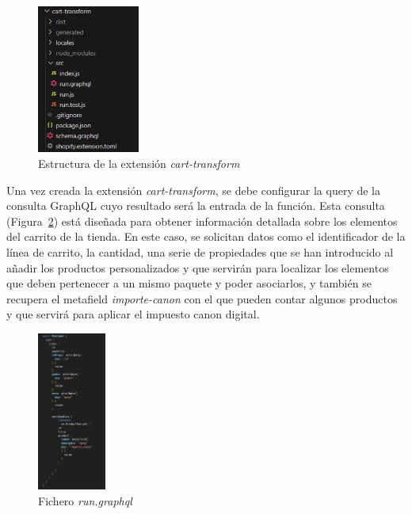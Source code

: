 \documentclass[12pt]{article}
\begin{document}
\begin{figure}[ht]
    \centering
    \includegraphics[width=0.3\textwidth]{imagenes-tema/estructuraCartTransform.png}
    \caption{\label{fig:estructuracarttrans} Estructura de la extensión \textit{cart-transform}}
    \vspace{\fill}
\end{figure}

Una vez creada la extensión \textit{cart-transform}, se debe configurar la query de la consulta GraphQL cuyo resultado será la entrada de la función. Esta consulta (Figura~\ref{fig:queryCart}) está diseñada para obtener
información detallada sobre los elementos del carrito de la tienda. En este caso, se solicitan datos como el identificador de la línea de carrito, la cantidad, una serie de propiedades que se han introducido al añadir los productos personalizados 
y que servirán para localizar los elementos que deben pertenecer a un mismo paquete y poder asociarlos, y también se recupera el 
metafield \textit{importe-canon} con el que pueden contar algunos productos y que servirá para aplicar el impuesto canon digital.


\begin{figure}[ht]
    \centering
    \includegraphics[width=0.2\textwidth]{imagenes-tema/queryCartTransform.png}
    \caption{\label{fig:queryCart} Fichero \textit{run.graphql}}
    \vspace{\fill}
\end{figure}
\end{document}
